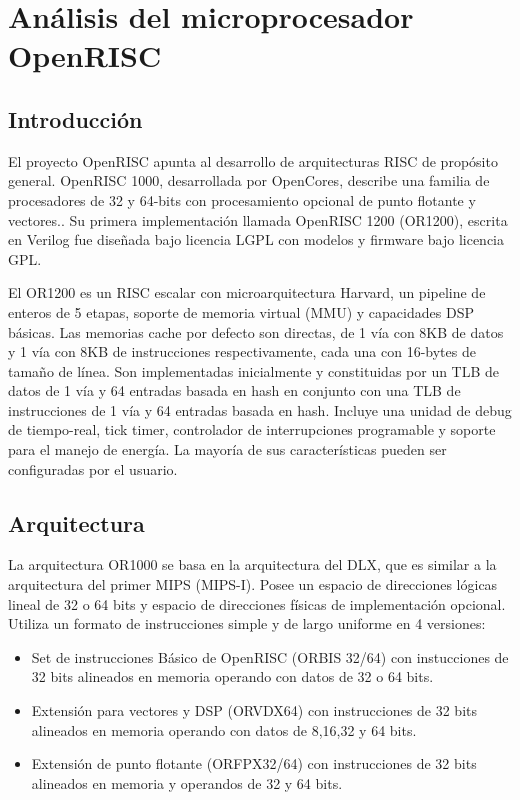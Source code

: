 \chapter{Análisis del microprocesador OpenRISC}
	\section{Introducción}
	El proyecto OpenRISC apunta al desarrollo de arquitecturas RISC de propósito general. OpenRISC 1000, desarrollada por OpenCores, describe una
	familia de procesadores de 32 y 64-bits con procesamiento opcional de punto flotante y vectores.\cite{etiqueta_OR_01}. Su primera implementación
	llamada OpenRISC 1200 (OR1200), escrita en Verilog fue diseñada bajo licencia LGPL con modelos y firmware bajo licencia GPL. 
	
	El OR1200 es un RISC escalar con microarquitectura Harvard, un pipeline de enteros de 5 etapas, soporte de memoria virtual (MMU) y capacidades DSP
	básicas. Las memorias cache por defecto son directas, de 1 vía con 8KB de datos y 1 vía con 8KB de instrucciones respectivamente, cada  una con
	16-bytes de tamaño de línea. Son implementadas inicialmente y constituidas por un TLB de datos de 1 vía y 64 entradas basada en hash en conjunto con
	una TLB de instrucciones de 1 vía y 64 entradas basada en hash. Incluye una unidad de debug de tiempo-real, tick timer, controlador de interrupciones
	programable y soporte para el manejo de energía. La mayoría de sus características pueden ser configuradas por el usuario.
		
	\section{Arquitectura}
	
	La arquitectura OR1000 se basa en la arquitectura del DLX, que es similar a la arquitectura del primer MIPS (MIPS-I). Posee un espacio de direcciones
	lógicas lineal de 32 o 64 bits y espacio de direcciones físicas de implementación opcional. Utiliza un formato de instrucciones simple y de largo
	uniforme en 4 versiones:
	
	\begin{itemize}
	  \item  Set de instrucciones Básico de OpenRISC (ORBIS 32/64) con instucciones de 32 bits alineados en memoria operando con datos de 32 o 64
	  bits.
	  \item Extensión para vectores y DSP (ORVDX64) con instrucciones de 32 bits alineados en memoria operando con datos de 8,16,32 y 64 bits.
	  \item Extensión de punto flotante (ORFPX32/64) con instrucciones de 32 bits alineados en memoria y operandos de 32 y 64 bits.  
	\end{itemize}
	
